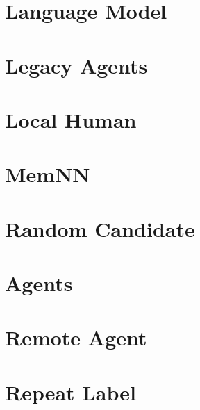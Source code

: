 \documentclass[twoside]{book}
\newcommand{\+}{\discretionary{\mbox{\scriptsize$\hookleftarrow$}}{}{}}
\begin{document}
\chapter{Language Model}
\label{md_parlai_agents_language_model_README}

\chapter{Legacy Agents}
\label{md_parlai_agents_legacy_agents_README}

\chapter{Local Human}
\label{md_parlai_agents_local_human_README}

\chapter{Mem\+NN}
\label{md_parlai_agents_memnn_README}

\chapter{Random Candidate}
\label{md_parlai_agents_random_candidate_README}

\chapter{Agents}
\label{md_parlai_agents_README}

\chapter{Remote Agent}
\label{md_parlai_agents_remote_agent_README}

\chapter{Repeat Label}
\label{md_parlai_agents_repeat_label_README}

\end{document}
